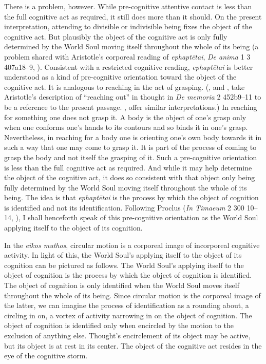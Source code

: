 There is a problem, however. While pre-cognitive attentive contact is less than the full cognitive act as required, it still does more than it should. On the present interpretation, attending to divisible or indivisible being fixes the object of the cognitive act. But plausibly the object of the cognitive act is only fully determined by the World Soul moving itself throughout the whole of its being (a problem shared with Aristotle's corporeal reading of \emph{ephaptētai}, \emph{De anima} 1 3 407a18--9, \citealt[84, 98--9 n26]{Lee:1976xs}). Consistent with a restricted cognitive reading, \emph{ephaptētai} is better understood as a kind of pre-cognitive orientation toward the object of the cognitive act. It is analogous to reaching in the act of grasping. (\citealt[276]{Ross:1906fk}, and \citealt[404 n335]{Cherniss:1944aa}, take Aristotle's description of ``reaching out'' in thought in \emph{De memoria} 2 452b9--11 to be a reference to the present passage. \citealt[98--9 n26]{Lee:1976xs}, \citealt[87]{Corcilius:2018bd} \citealt[134]{Betegh:2019fq} offer similar interpretations.) In reaching for something one does not grasp it. A body is the object of one's grasp only when one conforms one's hands to its contours and so binds it in one's grasp. Nevertheless, in reaching for a body one is orienting one's own body towards it in such a way that one may come to grasp it. It is part of the process of coming to grasp the body and not itself the grasping of it. Such a pre-cognitive orientation is less than the full cognitive act as required. And while it may help determine the object of the cognitive act, it does so consistent with that object only being fully determined by the World Soul moving itself throughout the whole of its being. The idea is that \emph{ephaptētai} is the process by which the object of cognition is identified and not its identification. Following Proclus (\emph{In Timaeum} 2 300 10--14, \citealt{Diehl:1903re}), I shall henceforth speak of this pre-cognitive orientation as the World Soul applying itself to the object of its cognition. 

In the \emph{eikos muthos}, circular motion is a corporeal image of incorporeal cognitive activity. In light of this, the World Soul's applying itself to the object of its cognition can be pictured as follows. The World Soul's applying itself to the object of cognition is the process by which the object of cognition is identified. The object of cognition is only identified when the World Soul moves itself throughout the whole of its being. Since circular motion is the corporeal image of the latter, we can imagine the process of identification as a rounding about, a circling in on, a vortex of activity narrowing in on the object of cognition. The object of cognition is identified only when encircled by the motion to the exclusion of anything else. Thought's encirclement of its object may be active, but its object is at rest in its center. The object of the cognitive act resides in the eye of the cognitive storm.



